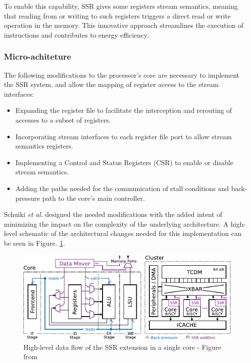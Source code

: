 To enable this capability, SSR gives some registers stream semantics, meaning that reading from or writing to such registers triggers a direct read or write operation in the memory. This innovative approach streamlines the execution of instructions and contributes to energy efficiency.

\subsubsection{Micro-achiteture}

The following modifications to the processor's core are necessary to implement the SSR system, and allow the mapping of register access to the stream interfaces:

\begin{itemize}
\item[]  Expanding the register file to facilitate the interception and rerouting of accesses to a subset of registers.
\item[]  Incorporating stream interfaces to each register file port to allow stream semantics registers.
\item[]  Implementing a Control and Status Registers (CSR) to enable or disable stream semantics.
\item[]  Adding the paths needed for the communication of stall conditions and back-pressure path to the core's main controller.
\end{itemize}

Schuiki \textit{et al.} \cite{9068465} designed the needed modifications with the added intent of minimizing the impact on the complexity of the underlying architecture. A high-level schematic of the architectural changes needed for this implementation can be seen in Figure. \ref{fig:ssr-overview}.

\begin{figure}[H]
	\begin{center}
 		\includegraphics[width=0.87\linewidth]{images/ssr-overview.pdf}
 		\caption{High-level data flow of the SSR extension in a single core  - Figure from \cite{9068465}}
 		\label{fig:ssr-overview}
	\end{center} 
\end{figure}

